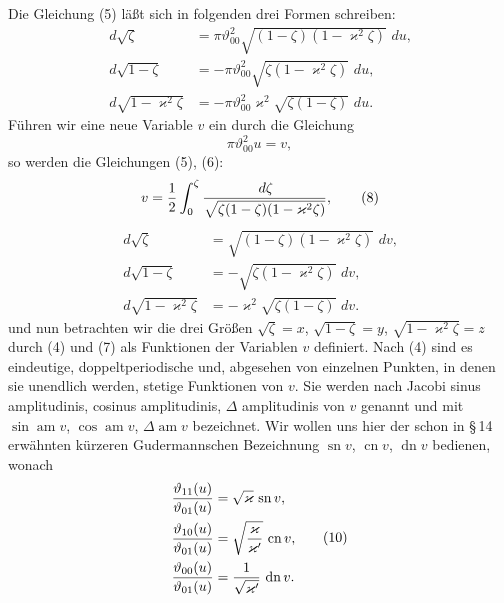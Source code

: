\documentclass[11pt]{article}
\providecommand{\dd}{\,d}
\providecommand{\tht}{\vartheta}
\providecommand{\sn}{\operatorname{sn}}
\providecommand{\cn}{\operatorname{cn}}
\providecommand{\dn}{\operatorname{dn}}
\providecommand{\am}{\operatorname{am}}
\begin{document}
Die Gleichung (5) läßt sich in folgenden drei Formen schreiben:
\begin{equation}
\begin{aligned}
\dd\sqrt\zeta&=\pi\tht_{00}^{2}\sqrt{(1-\zeta)(1-\varkappa^2\zeta)}\,\dd u,\\
\dd\sqrt{1-\zeta}&=-\pi\tht_{00}^{2}\sqrt{\zeta(1-\varkappa^2\zeta)}\,\dd u,\\
\dd\sqrt{1-\varkappa^2\zeta}&=-\pi\tht_{00}^{2}\varkappa^2\sqrt{\zeta(1-\zeta)}\,\dd u.
\end{aligned}
\tag{6}
\end{equation}
Führen wir eine neue Variable $v$ ein durch die Gleichung
\begin{equation}
\pi\tht_{00}^{2}u=v,
\tag{7}
\end{equation}
so werden die Gleichungen (5), (6):
\begin{equation}
 v={1\over2}\int_0^\zeta {\dd\zeta\over\sqrt{\zeta(1-\zeta)(1-\varkappa^2\zeta)}},
\tag{8}
\end{equation}
\begin{equation}
\begin{aligned}
\dd\sqrt\zeta&=\sqrt{(1-\zeta)(1-\varkappa^2\zeta)}\,\dd v,\\
\dd\sqrt{1-\zeta}&=-\sqrt{\zeta(1-\varkappa^2\zeta)}\,\dd v,\\
\dd\sqrt{1-\varkappa^2\zeta}&=-\varkappa^2\sqrt{\zeta(1-\zeta)}\,\dd v.
\end{aligned}
\tag{9}
\end{equation}
und nun betrachten wir die drei Größen $\sqrt\zeta=x$, $\sqrt{1-\zeta}=y$, $\sqrt{1-\varkappa^2\zeta}=z$ durch (4) und (7) als Funktionen der Variablen $v$ definiert. Nach (4) sind es eindeutige, doppeltperiodische und, abgesehen von einzelnen Punkten, in denen sie unendlich werden, stetige Funktionen von $v$. Sie werden nach Jacobi sinus amplitudinis, cosinus amplitudinis, $\Delta$ amplitudinis von $v$ genannt und mit $\sin\am v$, $\cos\am v$, $\Delta\am v$ bezeichnet. Wir wollen uns hier der schon in \S\,14 erwähnten kürzeren Gudermannschen Bezeichnung $\sn v$, $\cn v$, $\dn v$ bedienen, wonach
\begin{equation}
\begin{aligned}
{\tht_{11}(u)\over\tht_{01}(u)}&=\sqrt{\varkappa}\,\sn v,\\
{\tht_{10}(u)\over\tht_{01}(u)}&=\sqrt{\varkappa\over\varkappa'}\,\cn v,\\
{\tht_{00}(u)\over\tht_{01}(u)}&={1\over\sqrt{\varkappa'}}\,\dn v.
\end{aligned}
\tag{10}
\end{equation}
\end{document}
